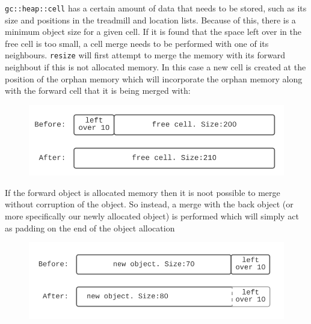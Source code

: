 \documentclass[11pt]{article}
\begin{document}
\texttt{gc::heap::cell} has a certain amount of data that needs to be stored, such as its size and positions in the 
treadmill and location lists. Because of this, there is a minimum object size for a given cell. If it is found that the space left
over in the free cell is too small, a cell merge needs to be performed with one of its neighbours. \texttt{resize} will first attempt to merge
the memory with its forward neighbout if this is not allocated memory. In this case a new cell is created at the position of the 
orphan memory which will incorporate the orphan memory along with the forward cell that it is being merged with:

\begin{figure}[H]
    \begin{center}
    \includegraphics[scale=0.5]{./report_srcs/forward_merge.png}
    \end{center}
\end{figure}


If the forward object is allocated memory then it is noot possible to merge without corruption of the object. So instead, a merge with
the back object (or more specifically our newly allocated object) is performed which will simply act as padding on the end of the
object allocation

\begin{figure}[H]
    \begin{center}
    \includegraphics[scale=0.5]{./report_srcs/backward_merge.png}
    \end{center}
\end{figure}
\end{document}
